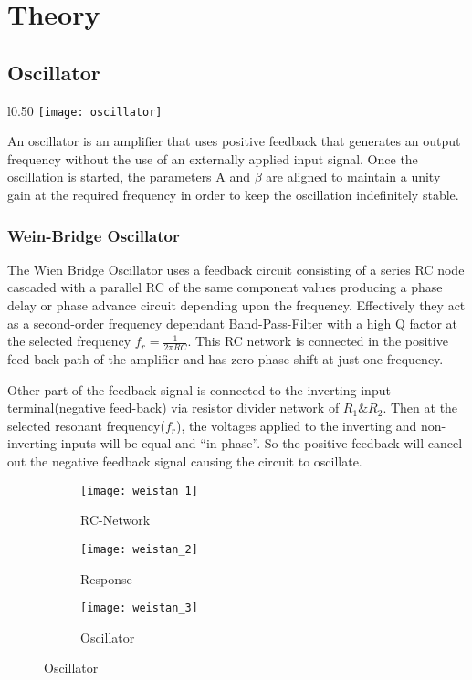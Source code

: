 
\section{Theory}
\subsection{Oscillator}
\begin{wrapfigure}{l}{0.50\columnwidth}
  \vspace*{-.5cm}
  \texttt{[image: oscillator]}
  \vspace*{-.8cm}
\end{wrapfigure}

An oscillator is an amplifier that uses positive feedback that generates an output frequency without the use of an externally applied input signal. Once the oscillation is started, the parameters A and $\beta$ are aligned to maintain a unity gain at the required frequency in order to keep the oscillation indefinitely stable.

\subsubsection*{Wein-Bridge Oscillator}
The Wien Bridge Oscillator uses a feedback circuit consisting of a series RC node cascaded with a parallel RC of the same component values producing a phase delay or phase advance circuit depending upon the frequency. Effectively they act as a second-order frequency dependant Band-Pass-Filter with a high Q factor at the selected frequency $f_r=\frac{1}{2\pi RC}$. This RC network is connected in the positive feed-back path of the amplifier and has zero phase shift at just one frequency.
\par
Other part of the feedback signal is connected to the inverting input terminal(negative feed-back) via resistor divider network of $R_1\&R_2$. Then at the selected resonant frequency($f_r$), the voltages applied to the inverting and non-inverting inputs will be equal and “in-phase”. So the positive feedback will cancel out the negative feedback signal causing the circuit to oscillate.

\begin{figure}[h]
  \begin{subfigure}{.58\columnwidth}
    \centering
    \texttt{[image: weistan\_1]}
    \caption*{RC-Network}
  \end{subfigure}
  \begin{subfigure}{.38\columnwidth}
    \centering
    \texttt{[image: weistan\_2]}
    \caption*{Response}
  \end{subfigure}
  \newline
  \centering
  \begin{subfigure}{.65\columnwidth}
    \texttt{[image: weistan\_3]}
    \caption*{Oscillator}
  \end{subfigure}
\end{figure}

